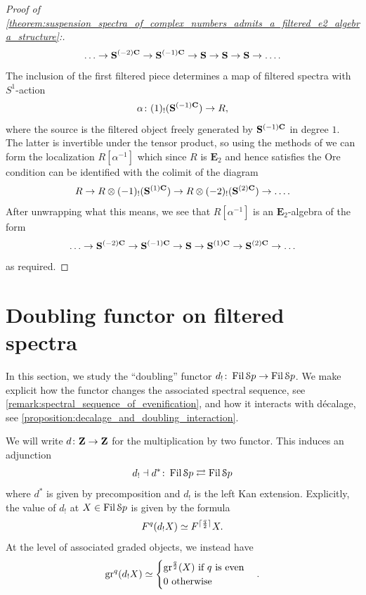 \documentclass[oneside,a4paper]{amsart}
\begin{document}
\begin{proof}[{Proof of \cref{theorem:suspension_spectra_of_complex_numbers_admits_a_filtered_e2_algebra_structure}:}]
\[
\ldots \rightarrow \mathbf{S}^{(-2)\mathbf{C}} \rightarrow \mathbf{S}^{(-1)\mathbf{C}} \rightarrow \mathbf{S} \rightarrow \mathbf{S} \rightarrow \mathbf{S} \rightarrow \ldots. 
\]
The inclusion of the first filtered piece determines a map of filtered spectra with $S^{1}$-action 
\[
\alpha \colon (1)_{!}(\mathbf{S}^{(-1)\mathbf{C}}) \rightarrow R, 
\]
where the source is the filtered object freely generated by $\mathbf{S}^{(-1)\mathbf{C}}$ in degree $1$. The latter is invertible under the tensor product, so using the methods of \cite[{\S 7.2.3}]{HA} we can form the localization $R[\alpha^{-1}]$ which since $R$ is $\mathbf{E}_{2}$ and hence satisfies the Ore condition can be identified with the colimit of the diagram 
\[
R \rightarrow R \otimes (-1)_{!}(\mathbf{S}^{(1)\mathbf{C}}) \rightarrow R \otimes (-2)_{!}(\mathbf{S}^{(2)\mathbf{C}}) \rightarrow \ldots.
\]
After unwrapping what this means, we see that $R[\alpha^{-1}]$ is an $\mathbf{E}_{2}$-algebra of the form 
\[
\ldots \rightarrow \mathbf{S}^{(-2)\mathbf{C}} \rightarrow \mathbf{S}^{(-1)\mathbf{C}} \rightarrow \mathbf{S} \rightarrow \mathbf{S}^{(1)\mathbf{C}} \rightarrow \mathbf{S}^{(2)\mathbf{C}} \rightarrow \ldots
\]
as required. 
\end{proof}

\section{Doubling functor on filtered spectra} 

In this section, we study the ``doubling'' functor $d_{!} \colon \operatorname{Fil}\EuScript{S}p \rightarrow \operatorname{Fil}\EuScript{S}p$. We make explicit how the functor changes the associated spectral sequence, see \cref{remark:spectral_sequence_of_evenification}, and how it interacts with d\'{e}calage, see \cref{proposition:decalage_and_doubling_interaction}. 

\begin{recollection}
\label{recollection:evenification_functor_on_filtered_spectra}
We will write $d \colon \mathbf{Z} \rightarrow \mathbf{Z}$ for the multiplication by two functor. This induces an adjunction 
\[
d_{!} \dashv d^{*} \colon \operatorname{Fil} \EuScript{S}p \rightleftarrows \operatorname{Fil} \EuScript{S}p 
\]
where $d^{*}$ is given by precomposition and $d_{!}$ is the left Kan extension. Explicitly, the value of $d_{!}$ at $X \in \operatorname{Fil} \EuScript{S}p$ is given by the formula
\[
F^{q}(d_{!} X) \simeq F^{\lceil\frac{q}{2}\rceil} X. 
\]
At the level of associated graded objects, we instead have 
\[
\operatorname{gr}^{q}(d_{!} X) \simeq  
\begin{cases}
\operatorname{gr}^{\frac{q}{2}}(X) \textnormal{ if } q  \textnormal{ is even} \\
0 \textnormal{ otherwise} 
\end{cases}.
\]
\end{recollection}
\end{document}
